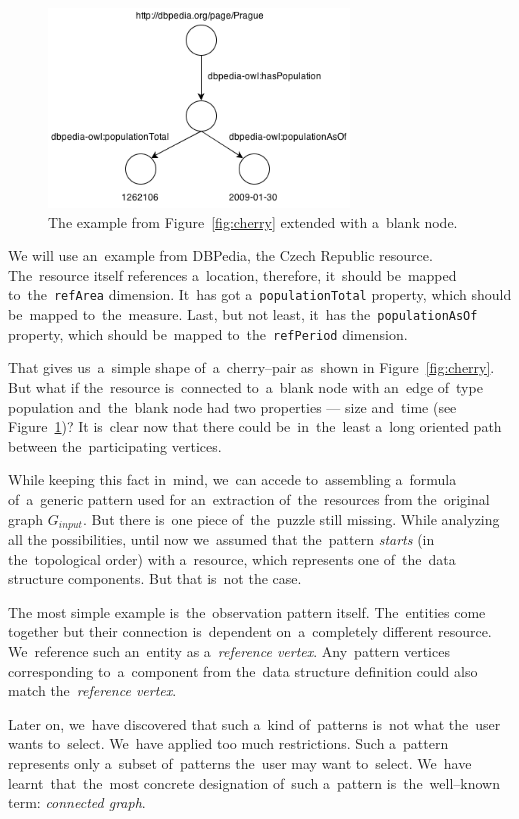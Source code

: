 \begin{figure}
	\centering
	\includegraphics[width=80mm]{images/cherry_blank.png}
	\caption{The example from Figure~\ref{fig:cherry} extended with a~blank node.}
	\label{fig:cherry-blank}
\end{figure}

We will use an~example from DBPedia, 
the Czech Republic resource. The~resource itself references a~location, 
therefore, it~should be~mapped to~the~\verb|refArea| dimension. It~has got a~\verb|populationTotal| property, which should be~mapped to~the~measure. Last, but not 
least, it~has the~\verb|populationAsOf| property, which should be~mapped to~the~\verb|refPeriod| dimension.

That gives us~a~simple shape of~a~cherry--pair as~shown in
Figure~\ref{fig:cherry}. But what 
if the~resource is~connected to~a~blank node with an~edge of~type 
population and~the~blank node had two properties --- size and~time
(see Figure~\ref{fig:cherry-blank})?
It is~clear now that there could be~in~the~least a~long oriented path between the~participating 
vertices.

While keeping this fact in~mind, we~can accede to~assembling a~formula of~a~generic pattern
used for an~extraction of~the~resources from the~original graph $G_{input}$. But 
there is~one piece of~the~puzzle still missing. While analyzing all the
possibilities, until now we~assumed that the~pattern \emph{starts} (in the~topological order)
with a~resource, which represents one of~the~data structure components. But that is~not  
the case.

The most simple example is~the~observation pattern itself. The~entities come together but their connection is~dependent on~a~completely 
different resource. We~reference such an~entity
as a~\emph{reference vertex}. Any~pattern vertices corresponding to~a~component from the~data structure definition could also match the~\emph{reference vertex}.

Later on, we~have discovered that such a~kind of~patterns is~not what the~user 
wants to~select. We~have applied too much restrictions. Such a~pattern
represents only a~subset of~patterns the~user may want to~select. We~have learnt~that~the~most concrete designation of~such a~pattern is~the~well--known term:
\emph{connected graph}.

